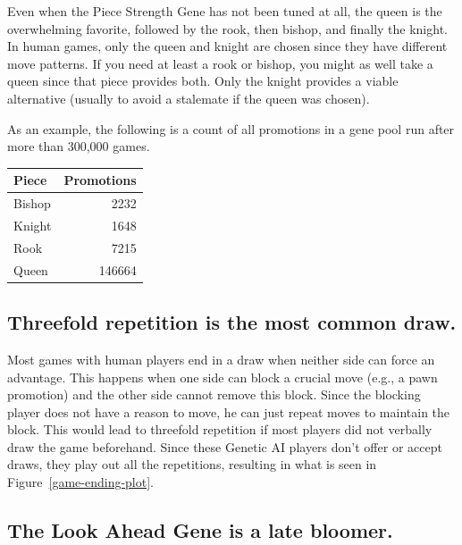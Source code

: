 \documentclass[letterpaper]{article}
\renewcommand{\_}{\allowbreak\textunderscore\allowbreak}
\begin{document}
Even when the Piece Strength Gene has not been tuned at all, the queen is the overwhelming favorite, followed by the rook, then bishop, and finally the knight. In human games, only the queen and knight are chosen since they have different move patterns. If you need at least a rook or bishop, you might as well take a queen since that piece provides both. Only the knight provides a viable alternative (usually to avoid a stalemate if the queen was chosen).

As an example, the following is a count of all promotions in a gene pool run after more than 300,000 games.
\begin{center}
\begin{tabular}{l r}
	Piece & Promotions \\
\toprule
	Bishop & 2232  \\
	Knight  &  1648 \\
	Rook    &  7215 \\
	Queen  & 146664 \\
\end{tabular}
\end{center}


\subsection{Threefold repetition is the most common draw.}

Most games with human players end in a draw when neither side can force an advantage. This happens when one side can block a crucial move (e.g., a pawn promotion) and the other side cannot remove this block. Since the blocking player does not have a reason to move, he can just repeat moves to maintain the block. This would lead to threefold repetition if most players did not verbally draw the game beforehand. Since these Genetic AI players don't offer or accept draws, they play out all the repetitions, resulting in what is seen in Figure~\ref{game-ending-plot}.

\subsection{The Look Ahead Gene is a late bloomer.}
\end{document}
